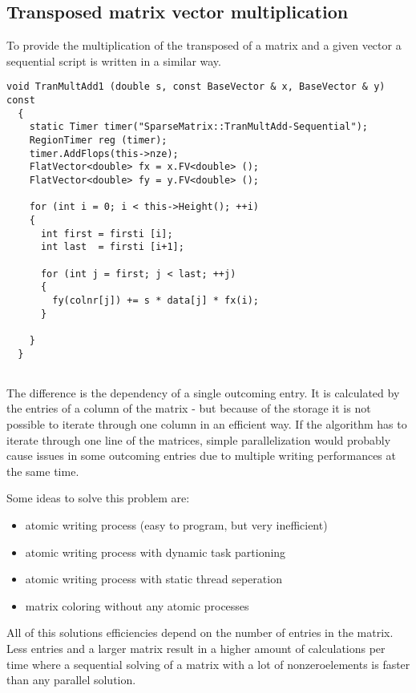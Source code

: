 \documentclass[a4paper,11pt]{scrartcl}
\begin{document}
\subsection{Transposed matrix vector multiplication}

To provide the multiplication of the transposed of a matrix and a given vector
 a sequential script is written in a similar way.

\begin{lstlisting}
void TranMultAdd1 (double s, const BaseVector & x, BaseVector & y) const
  {
    static Timer timer("SparseMatrix::TranMultAdd-Sequential");
    RegionTimer reg (timer);
    timer.AddFlops(this->nze);
    FlatVector<double> fx = x.FV<double> ();
    FlatVector<double> fy = y.FV<double> ();

    for (int i = 0; i < this->Height(); ++i)
    {
      int first = firsti [i];
      int last  = firsti [i+1];

      for (int j = first; j < last; ++j)
      {
        fy(colnr[j]) += s * data[j] * fx(i);
      }

    }
  }


\end{lstlisting}

The difference is the dependency of a single outcoming entry. It is calculated
 by the entries of a column of the matrix - but because of the storage it is not
possible to iterate through one column in an efficient way. If the algorithm 
has to iterate through one line of the matrices, simple parallelization would
probably cause issues in some outcoming entries due to multiple writing
performances at the same time. 

Some ideas to solve this problem are:

\begin{itemize}

\item atomic writing process (easy to program, but very inefficient)
\item atomic writing process with dynamic task partioning
\item atomic writing process with static thread seperation
\item matrix coloring without any atomic processes

\end{itemize} 

All of this solutions efficiencies depend on the number of entries in the matrix.
Less entries and a larger matrix result in a higher amount of calculations per
 time where a sequential solving of a matrix with a lot of nonzeroelements is
 faster than any parallel solution.
\end{document}
